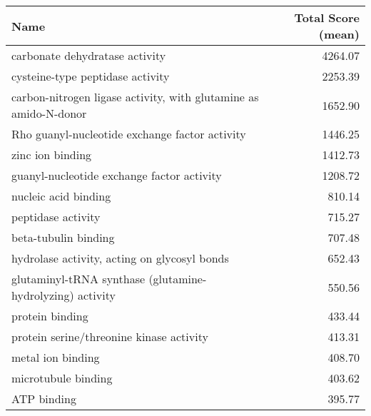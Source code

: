 \begin{table}[hp]
\begin{center} \sf
\begin{tabular}{p{}r}
\toprule
\textbf{Name}                                                    & \textbf{Total Score (mean)} \\ \midrule
carbonate dehydratase activity                                   & 4264.07                     \\
cysteine-type peptidase activity                                 & 2253.39                     \\
carbon-nitrogen ligase activity, with glutamine as amido-N-donor & 1652.90                     \\
Rho guanyl-nucleotide exchange factor activity                   & 1446.25                     \\
zinc ion binding                                                 & 1412.73                     \\
guanyl-nucleotide exchange factor activity                       & 1208.72                     \\
nucleic acid binding                                             & 810.14                      \\
peptidase activity                                               & 715.27                      \\
beta-tubulin binding                                             & 707.48                      \\
hydrolase activity, acting on glycosyl bonds                     & 652.43                      \\
glutaminyl-tRNA synthase (glutamine-hydrolyzing) activity        & 550.56                      \\
protein binding                                                  & 433.44                      \\
protein serine/threonine kinase activity                         & 413.31                      \\
metal ion binding                                                & 408.70                      \\
microtubule binding                                              & 403.62                      \\
ATP binding                                                      & 395.77                      \\

\end{tabular}
\end{center}
\end{table}

